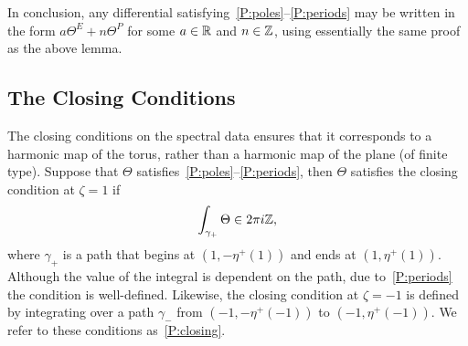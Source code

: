 \documentclass{article}
\begin{document}
In conclusion, any differential satisfying~\ref{P:poles}--\ref{P:periods} may be written in the form $a \Theta^E + n \Theta^P$ for some $a\in\mathbb{R}$ and $n\in\mathbb{Z}$, using essentially the same proof as the above lemma. 












\subsection{The Closing Conditions}
\label{subsec:closing conditions}
The closing conditions on the spectral data ensures that it corresponds to a harmonic map of the torus, rather than a harmonic map of the plane (of finite type). Suppose that $\Theta$ satisfies~\ref{P:poles}--\ref{P:periods}, then $\Theta$ satisfies the closing condition at $\zeta=1$ if
\[
\int_{\gamma_{+}} \Theta \in 2\pi i \mathbb{Z},
\]
where $\gamma_+$ is a path that begins at $(1,-\eta^+(1))$ and ends at $(1,\eta^+(1))$. Although the value of the integral is dependent on the path, due to~\ref{P:periods} the condition is well-defined. Likewise, the closing condition at $\zeta=-1$ is defined by integrating over a path $\gamma_-$ from $(-1,-\eta^+(-1))$ to $(-1,\eta^+(-1))$. We refer to these conditions as~\ref{P:closing}.
\end{document}
